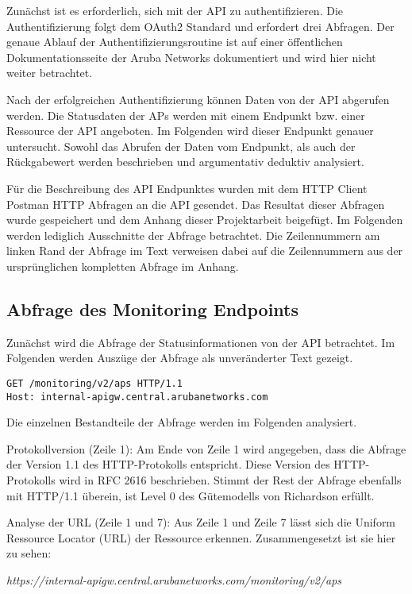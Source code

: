 Zunächst ist es erforderlich, sich mit der API zu authentifizieren. Die Authentifizierung folgt dem OAuth2 Standard und erfordert drei Abfragen. Der genaue Ablauf der Authentifizierungsroutine ist auf einer öffentlichen Dokumentationsseite der Aruba Networks dokumentiert und wird hier nicht weiter betrachtet.

Nach der erfolgreichen Authentifizierung können Daten von der API abgerufen werden. Die Statusdaten der APs werden mit einem Endpunkt bzw. einer Ressource der API angeboten. Im Folgenden wird dieser Endpunkt genauer untersucht. Sowohl das Abrufen der Daten vom Endpunkt, als auch der Rückgabewert werden beschrieben und argumentativ deduktiv analysiert. 

Für die Beschreibung des API Endpunktes wurden mit dem HTTP Client Postman HTTP Abfragen an die API gesendet. Das Resultat dieser Abfragen wurde gespeichert und dem Anhang dieser Projektarbeit beigefügt. Im Folgenden werden lediglich Ausschnitte der Abfrage betrachtet. Die Zeilennummern am linken Rand der Abfrage im Text verweisen dabei auf die Zeilennummern aus der ursprünglichen kompletten Abfrage im Anhang.

\subsection{Abfrage des Monitoring Endpoints}

Zunächst wird die Abfrage der Statusinformationen von der API betrachtet. Im Folgenden werden Auszüge der Abfrage als unveränderter Text gezeigt.

\begin{lstlisting}
GET /monitoring/v2/aps HTTP/1.1
Host: internal-apigw.central.arubanetworks.com  
\end{lstlisting}

Die einzelnen Bestandteile der Abfrage werden im Folgenden analysiert.

Protokollversion (Zeile 1): Am Ende von Zeile 1 wird angegeben, dass die Abfrage der Version 1.1 des HTTP-Protokolls entspricht. Diese Version des HTTP-Protokolls wird in RFC 2616 beschrieben. Stimmt der Rest der Abfrage ebenfalls mit HTTP/1.1 überein, ist Level 0 des Gütemodells von Richardson erfüllt.

Analyse der URL (Zeile 1 und 7): Aus Zeile 1 und Zeile 7 lässt sich die Uniform Ressource Locator (URL) der Ressource erkennen. Zusammengesetzt ist sie hier zu sehen:

\emph{https://internal-apigw.central.arubanetworks.com/monitoring/v2/aps}

